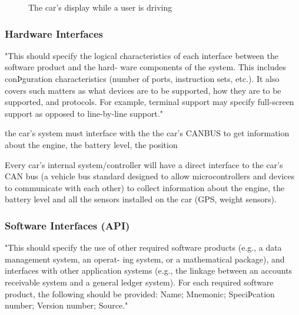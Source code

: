 \documentclass[english]{article}
\begin{document}
\begin{figure}[H]
	\centering
	\caption{The car's display while a user is driving}
\end{figure}


\subsubsection{Hardware Interfaces}

"This should specify the logical characteristics of each interface between the software product and the hard-
ware components of the system. This includes conÞguration characteristics (number of ports, instruction
sets, etc.). It also covers such matters as what devices are to be supported, how they are to be supported, and
protocols. For example, terminal support may specify full-screen support as opposed to line-by-line support."

the car's system must interface with the the car's CANBUS to get information about the engine, the battery level, the position

Every car's internal system/controller will have a direct interface to the car's CAN bus (a vehicle bus standard designed to allow microcontrollers and devices to communicate with each other) to collect information about the engine, the battery level and all the sensors installed on the car (GPS, weight sensors).

\subsubsection{Software Interfaces (API)}\label{apis}

"This should specify the use of other required software products (e.g., a data management system, an operat-
ing system, or a mathematical package), and interfaces with other application systems (e.g., the linkage
between an accounts receivable system and a general ledger system). For each required software product, the
following should be provided:
Name;
Mnemonic;
SpeciÞcation number;
Version number;
Source."
\end{document}
